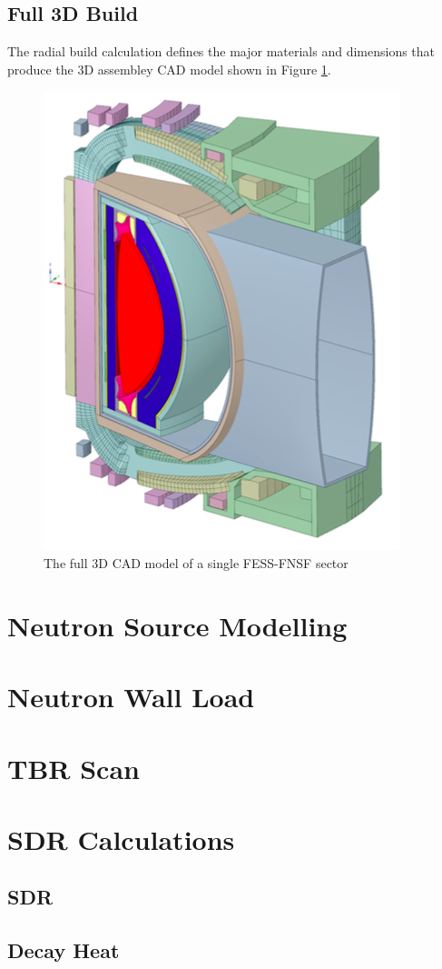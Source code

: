 \documentclass[12pt, letterpaper]{elsarticle}
\begin{document}
\subsection{Full 3D Build}
The radial build calculation defines the major materials and dimensions that produce the 
3D assembley CAD model shown in Figure \ref{fig:cad_fess_fnsf_3d}.
\begin{figure}[ht!]
  \centering
  \includegraphics[scale=0.8]{plots/fess_fnsf_3d_cad.png}
  \caption{The full 3D CAD model of a single FESS-FNSF sector}
  \label{fig:cad_fess_fnsf_3d}
\end{figure}
\section{Neutron Source Modelling}
\section{Neutron Wall Load}
\section{TBR Scan}
\section{SDR Calculations}
\subsection{SDR}
\subsection{Decay Heat}
\end{document}
